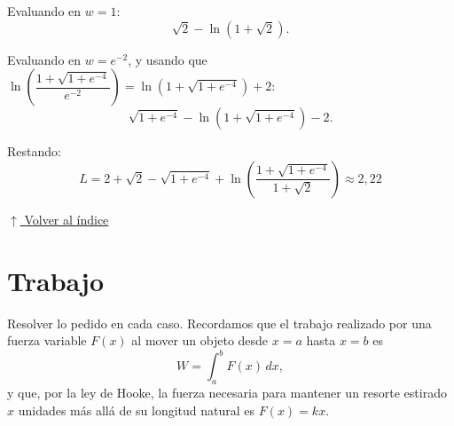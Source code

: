 \documentclass[12pt]{article}
\newcommand{\volverindice}{%
    \vspace{1em}%
    \begin{flushright}%
        \hyperlink{indice}{\small $\uparrow$ Volver al índice}%
    \end{flushright}%
}
\begin{document}
\begin{enumerate}[label=\alph*.-]
    Evaluando en $w=1$:
    \[
    \sqrt2-\ln\left(1+\sqrt2\right).
    \]

    Evaluando en $w=e^{-2}$, y usando que
    $\ln\left(\dfrac{1+\sqrt{1+e^{-4}}}{e^{-2}}\right)=\ln\left(1+\sqrt{1+e^{-4}}\right)+2$:
    \[
    \sqrt{1+e^{-4}}-\ln\left(1+\sqrt{1+e^{-4}}\right)-2.
    \]

    Restando:
    \[
    \boxed{
    L=2+\sqrt2-\sqrt{1+e^{-4}}+\ln\left(\frac{1+\sqrt{1+e^{-4}}}{1+\sqrt2}\right)
    \approx2{,}22
    }
    \]

\end{enumerate}

\volverindice
\newpage


\section{Trabajo}

Resolver lo pedido en cada caso. Recordamos que el trabajo realizado por
una fuerza variable $F(x)$ al mover un objeto desde $x=a$ hasta $x=b$ es
\[
W=\int_{a}^{b}F(x)\,dx,
\]
y que, por la ley de Hooke, la fuerza necesaria para mantener un
resorte estirado $x$ unidades más allá de su longitud natural es
$F(x)=kx$.
\end{document}
